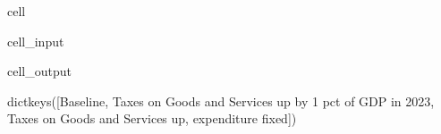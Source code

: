 \documentclass[letterpaper,10pt,english]{jupyterBook}
\begin{document}
\begin{sphinxuseclass}{cell}\begin{sphinxVerbatimInput}

\begin{sphinxuseclass}{cell_input}
\begin{sphinxVerbatim}[commandchars=\\\{\}]
\end{sphinxVerbatim}

\end{sphinxuseclass}\end{sphinxVerbatimInput}
\begin{sphinxVerbatimOutput}

\begin{sphinxuseclass}{cell_output}
\begin{sphinxVerbatim}[commandchars=\\\{\}]
dict\PYGZus{}keys([\PYGZsq{}Baseline\PYGZsq{}, \PYGZsq{}Taxes on Goods and Services up by 1 pct of GDP in 2023\PYGZsq{}, \PYGZsq{}Taxes on Goods and Services up, expenditure fixed\PYGZsq{}])
\end{sphinxVerbatim}

\end{sphinxuseclass}\end{sphinxVerbatimOutput}

\end{sphinxuseclass}
\end{document}
